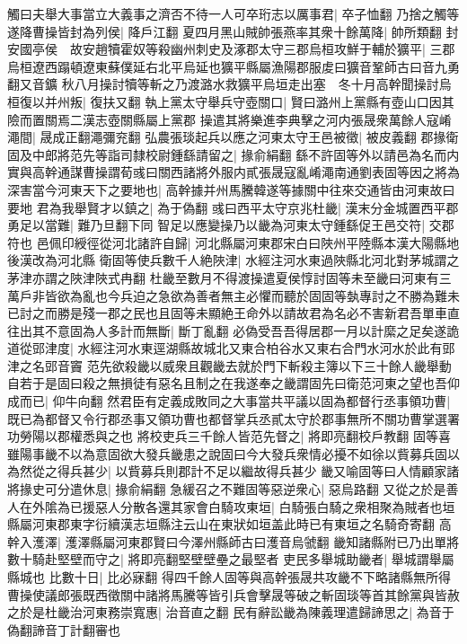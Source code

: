 觸曰夫舉大事當立大義事之濟否不待一人可卒珩志以厲事君|{
	卒子恤翻}
乃捨之觸等遂降曹操皆封為列侯|{
	降戶江翻}
夏四月黑山賊帥張燕率其衆十餘萬降|{
	帥所類翻}
封安國亭侯　故安趙犢霍奴等殺幽州刺史及涿郡太守三郡烏桓攻鮮于輔於獷平|{
	三郡烏桓遼西蹋頓遼東蘇僕延右北平烏延也獷平縣屬漁陽郡服䖍曰獷音鞏師古曰音九勇翻又音鑛}
秋八月操討犢等斬之乃渡潞水救獷平烏垣走出塞　冬十月高幹聞操討烏桓復以并州叛|{
	復扶又翻}
執上黨太守舉兵守壺關口|{
	賢曰潞州上黨縣有壺山口因其險而置關焉二漢志壺關縣屬上黨郡}
操遣其將樂進李典擊之河内張晟衆萬餘人寇崤澠間|{
	晟成正翻澠彌兖翻}
弘農張琰起兵以應之河東太守王邑被徵|{
	被皮義翻}
郡掾衛固及中郎將范先等詣司隸校尉鍾繇請留之|{
	掾俞絹翻}
繇不許固等外以請邑為名而内實與高幹通謀曹操謂荀彧曰關西諸將外服内貳張晟寇亂崤澠南通劉表固等因之將為深害當今河東天下之要地也|{
	高幹據并州馬騰韓遂等據關中往來交通皆由河東故曰要地}
君為我舉賢才以鎮之|{
	為于偽翻}
彧曰西平太守京兆杜畿|{
	漢末分金城置西平郡}
勇足以當難|{
	難乃旦翻下同}
智足以應變操乃以畿為河東太守鍾繇促王邑交符|{
	交郡符也}
邑佩印綬徑從河北諸許自歸|{
	河北縣屬河東郡宋白曰陜州平陸縣本漢大陽縣地後漢改為河北縣}
衛固等使兵數千人絶陜津|{
	水經注河水東過陜縣北河北對茅城謂之茅津亦謂之陜津陜式冉翻}
杜畿至數月不得渡操遣夏侯惇討固等未至畿曰河東有三萬戶非皆欲為亂也今兵迫之急欲為善者無主必懼而聽於固固等埶專討之不勝為難未已討之而勝是殘一郡之民也且固等未顯絶王命外以請故君為名必不害新君吾單車直往出其不意固為人多計而無斷|{
	斷丁亂翻}
必偽受吾吾得居郡一月以計縻之足矣遂詭道從郖津度|{
	水經注河水東逕湖縣故城北又東合柏谷水又東右合門水河水於此有郖津之名郖音竇}
范先欲殺畿以威衆且觀畿去就於門下斬殺主簿以下三十餘人畿舉動自若于是固曰殺之無損徒有惡名且制之在我遂奉之畿謂固先曰衛范河東之望也吾仰成而已|{
	仰牛向翻}
然君臣有定義成敗同之大事當共平議以固為都督行丞事領功曹|{
	既已為都督又令行郡丞事又領功曹也都督掌兵丞貳太守於郡事無所不關功曹掌選署功勞陽以郡權悉與之也}
將校吏兵三千餘人皆范先督之|{
	將即亮翻校戶教翻}
固等喜雖陽事畿不以為意固欲大發兵畿患之說固曰今大發兵衆情必擾不如徐以貲募兵固以為然從之得兵甚少|{
	以貲募兵則郡計不足以繼故得兵甚少}
畿又喻固等曰人情顧家諸將掾史可分遣休息|{
	掾俞絹翻}
急緩召之不難固等惡逆衆心|{
	惡烏路翻}
又從之於是善人在外隂為已援惡人分散各還其家會白騎攻東垣|{
	白騎張白騎之衆相聚為賊者也垣縣屬河東郡東字衍續漢志垣縣注云山在東狀如垣盖此時已有東垣之名騎奇寄翻}
高幹入濩澤|{
	濩澤縣屬河東郡賢曰今澤州縣師古曰濩音烏虢翻}
畿知諸縣附已乃出單將數十騎赴堅壁而守之|{
	將即亮翻堅壁壁壘之最堅者}
吏民多舉城助畿者|{
	舉城謂舉屬縣城也}
比數十日|{
	比必寐翻}
得四千餘人固等與高幹張晟共攻畿不下略諸縣無所得曹操使議郎張既西徵關中諸將馬騰等皆引兵會擊晟等破之斬固琰等首其餘黨與皆赦之於是杜畿治河東務崇寬惠|{
	治音直之翻}
民有辭訟畿為陳義理遣歸諦思之|{
	為音于偽翻諦音丁計翻審也}

